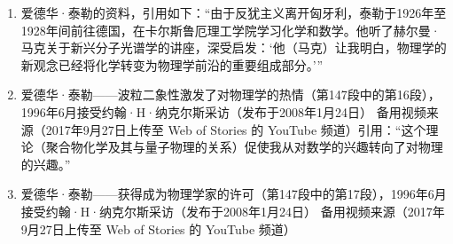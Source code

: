 \begin{enumerate}
\item 爱德华·泰勒的资料，引用如下：“由于反犹主义离开匈牙利，泰勒于1926年至1928年间前往德国，在卡尔斯鲁厄理工学院学习化学和数学。他听了赫尔曼·马克关于新兴分子光谱学的讲座，深受启发：‘他（马克）让我明白，物理学的新观念已经将化学转变为物理学前沿的重要组成部分。’”
\item 爱德华·泰勒——波粒二象性激发了对物理学的热情（第147段中的第16段），1996年6月接受约翰·H·纳克尔斯采访（发布于2008年1月24日）
备用视频来源（2017年9月27日上传至 Web of Stories 的 YouTube 频道）引用：“这个理论（聚合物化学及其与量子物理的关系）促使我从对数学的兴趣转向了对物理的兴趣。”
\item 爱德华·泰勒——获得成为物理学家的许可（第147段中的第17段），1996年6月接受约翰·H·纳克尔斯采访（发布于2008年1月24日）
备用视频来源（2017年9月27日上传至 Web of Stories 的 YouTube 频道）

\end{enumerate}